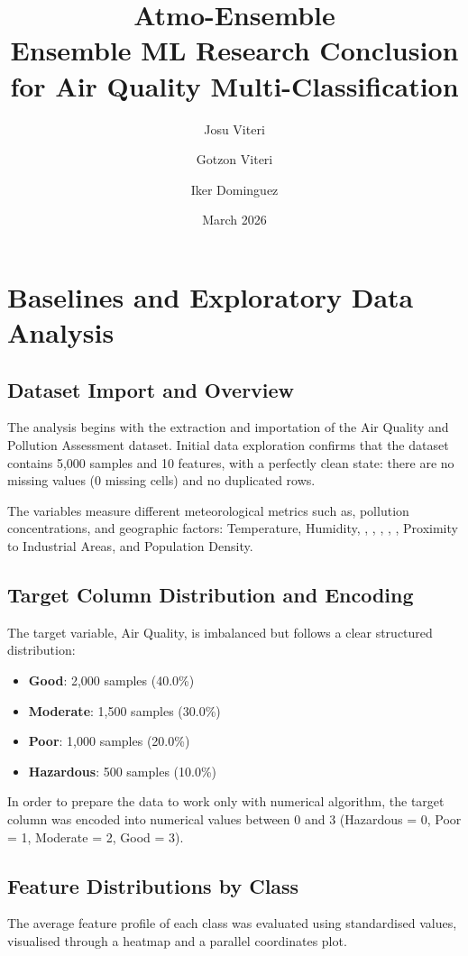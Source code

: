 \documentclass[a4paper,12pt]{article}
\title{\textbf{Atmo-Ensemble}\\Ensemble ML Research Conclusion for Air Quality Multi-Classification}
\author{Josu Viteri \and Gotzon Viteri \and Iker Dominguez}
\date{March 2026}
\begin{document}
	
	\maketitle
	
	\begin{abstract}
	\end{abstract}
	
	\section{Baselines and Exploratory Data Analysis}
	
	\subsection{Dataset Import and Overview}
	The analysis begins with the extraction and importation of the Air Quality and Pollution Assessment dataset. Initial data exploration confirms that the dataset contains 5,000 samples and 10 features, with a perfectly clean state: there are no missing values (0 missing cells) and no duplicated rows. 
	
	The variables measure different meteorological metrics such as, pollution concentrations, and geographic factors: Temperature, Humidity, , , , , , Proximity to Industrial Areas, and Population Density.
	
	\subsection{Target Column Distribution and Encoding}
	The target variable, Air Quality, is imbalanced but follows a clear structured distribution:
	\begin{itemize}
		\item \textbf{Good}: 2,000 samples (40.0\%)
		\item \textbf{Moderate}: 1,500 samples (30.0\%)
		\item \textbf{Poor}: 1,000 samples (20.0\%)
		\item \textbf{Hazardous}: 500 samples (10.0\%)
	\end{itemize}
	
	In order to prepare the data to work only with numerical algorithm, the target column was encoded into numerical values between 0 and 3 (Hazardous = 0, Poor = 1, Moderate = 2, Good = 3).
	
	\newpage
	
	\subsection{Feature Distributions by Class}
	The average feature profile of each class was evaluated using standardised values, visualised through a heatmap and a parallel coordinates plot. 
	
\end{document}
